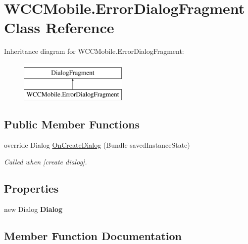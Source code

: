 \hypertarget{class_w_c_c_mobile_1_1_error_dialog_fragment}{}\section{W\+C\+C\+Mobile.\+Error\+Dialog\+Fragment Class Reference}
\label{class_w_c_c_mobile_1_1_error_dialog_fragment}
Inheritance diagram for W\+C\+C\+Mobile.\+Error\+Dialog\+Fragment\+:\begin{figure}[H]
\begin{center}
\leavevmode
\includegraphics[height=2.000000cm]{class_w_c_c_mobile_1_1_error_dialog_fragment}
\end{center}
\end{figure}
\subsection*{Public Member Functions}
\begin{DoxyCompactItemize}
\item 
override Dialog \hyperlink{class_w_c_c_mobile_1_1_error_dialog_fragment_a50bd333dad2d7cb06d5749bb556681fd}{On\+Create\+Dialog} (Bundle saved\+Instance\+State)
\begin{DoxyCompactList}\small\item\em Called when \mbox{[}create dialog\mbox{]}. \end{DoxyCompactList}\end{DoxyCompactItemize}
\subsection*{Properties}
\begin{DoxyCompactItemize}
\item 
new Dialog {\bfseries Dialog}\hypertarget{class_w_c_c_mobile_1_1_error_dialog_fragment_a611f4dc57228edabc30f3f87eef38608}{}\label{class_w_c_c_mobile_1_1_error_dialog_fragment_a611f4dc57228edabc30f3f87eef38608}

\end{DoxyCompactItemize}


\subsection{Member Function Documentation}
